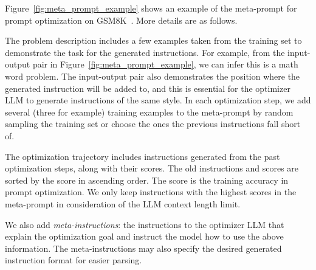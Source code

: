 Figure~\ref{fig:meta_prompt_example} shows an example of the meta-prompt for prompt optimization on GSM8K~\citep{cobbe2021training}.
More details are as follows.

 The problem description includes a few examples taken from the training set to demonstrate the task for the generated instructions. 
For example, from the input-output pair in Figure~\ref{fig:meta_prompt_example}, we can infer this is a math word problem. 
The input-output pair also demonstrates the position where the generated instruction will be added to, and this is essential for the optimizer LLM to generate instructions of the same style.
In each optimization step, we add several (three for example) training examples to the meta-prompt by random sampling the training set or choose the ones the previous instructions fall short of.

The optimization trajectory includes instructions generated from the past optimization steps, along with their scores.
The old instructions and scores are sorted by the score in ascending order.
The score is the training accuracy in prompt optimization. 
We only keep instructions with the highest scores in the meta-prompt in consideration of the LLM context length limit.

We also add \emph{meta-instructions}: the instructions to the optimizer LLM that explain the optimization goal and instruct the model how to use the above information.
The meta-instructions may also specify the desired generated instruction format for easier parsing.
